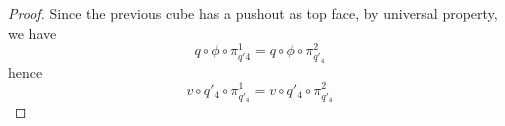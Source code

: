 \begin{proof}
	Since the previous cube has a pushout as top face, by universal property, we have
	\[
		q \circ \phi \circ \pi_{q'4}^1 = q \circ \phi \circ \pi_{q'_4}^2
	\]
	hence
	\[
		v \circ q'_4 \circ \pi_{q'_4}^1 = v \circ q'_4 \circ \pi_{q'_4}^2
	\]

\end{proof}

